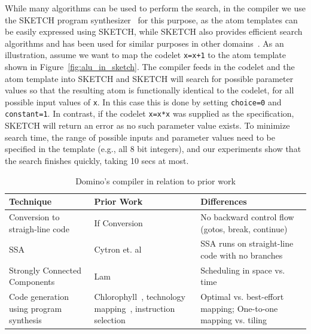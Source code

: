 While many algorithms can be used to perform the search, in the \pktlanguage
compiler we use the SKETCH program synthesizer~\cite{sketch_asplos} for this
purpose, as the atom templates can be easily expressed using SKETCH, while
SKETCH also provides efficient search algorithms and has been used for similar
purposes in other domains~\cite{bitstreaming, lifejoin, qbs, chlorophyll}.  As
an illustration, assume we want to map the codelet {\tt x=x+1} to the atom
template shown in Figure~\ref{fig:alu_in_sketch}. The \pktlanguage compiler
feeds in the codelet and the atom template into SKETCH and SKETCH will search
for possible parameter values so that the resulting atom is functionally
identical to the codelet, for all possible input values of {\tt x}.  In this
case this is done by setting {\tt choice=0} and {\tt constant=1}.  In contrast,
if the codelet {\tt x=x*x} was supplied as the specification, SKETCH will
return an error as no such parameter value exists. To minimize search time, the
range of possible inputs and parameter values need to be specified in the
template (e.g., all 8 bit integers), and our experiments show that the search
finishes quickly, taking 10 secs at most.


\begin{table}[!t]
  \begin{scriptsize}
    \begin{tabular}{|p{}|p{}|p{}|}
  \hline
  Technique & Prior Work & Differences \\
  \hline
  Conversion to straigh-line code & If Conversion~\cite{if_conversion} & No backward control flow (gotos, break, continue) \\
  \hline
  SSA & Cytron et. al~\cite{ssa} & SSA runs on straight-line code with no branches \\
  \hline
  Strongly Connected Components & Lam~\cite{software_pipelining} & Scheduling in space vs. time \\ %
  \hline
  Code generation using program synthesis & Chlorophyll~\cite{chlorophyll}, technology mapping~\cite{micheli, flowmap, spectransform}, instruction selection~\cite{muchnik} & Optimal vs. best-effort mapping; One-to-one mapping vs. tiling \\
  \hline
  \end{tabular}
  \end{scriptsize}
  \caption{Domino's compiler in relation to prior work}
  \label{tab:prior_compiler}
\end{table}

